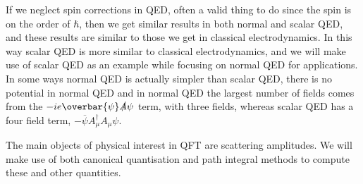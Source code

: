 \documentclass[fleqn]{NotesClass}
\newcommand{\diracadjoint}[1]{\overbar{#1}}
\newcommand{\hermit}{\dagger}
\begin{document}
    If we neglect spin corrections in QED, often a valid thing to do since the spin is on the order of \(\hbar\), then we get similar results in both normal and scalar QED, and these results are similar to those we get in classical electrodynamics.
    In this way scalar QED is more similar to classical electrodynamics, and we will make use of scalar QED as an example while focusing on normal QED for applications.
    In some ways normal QED is actually simpler than scalar QED, there is no potential in normal QED and in normal QED the largest number of fields comes from the \(-ie\diracadjoint{\psi}\slashed{A}\psi\) term, with three fields, whereas scalar QED has a four field term, \(-\diracadjoint{\psi}A_\mu^\hermit A_\mu \psi\).
    
    The main objects of physical interest in QFT are scattering amplitudes.
    We will make use of both canonical quantisation and path integral methods to compute these and other quantities.
    
\end{document}
